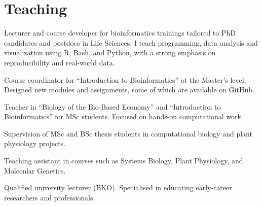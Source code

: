 \documentclass[a4paper,10pt]{article}
\begin{document}
\section*{Teaching}
\begin{description}
\raggedright
\item[\normalfont \textcolor{ColorOne}{2022 -- now.}] Lecturer and course developer for bioinformatics trainings tailored to PhD candidates and postdocs in Life Sciences. I teach programming, data analysis and visualization using R, Bash, and Python, with a strong emphasis on reproducibility and real-world data.
\item[\normalfont \textcolor{ColorOne}{2020 -- 2021.}] Course coordinator for “Introduction to Bioinformatics” at the Master's level. Designed new modules and assignments, some of which are available on GitHub.
\item[\normalfont \textcolor{ColorOne}{2018 -- 2021.}] Teacher in “Biology of the Bio-Based Economy” and “Introduction to Bioinformatics” for MSc students. Focused on hands-on computational work.
\item[\normalfont \textcolor{ColorOne}{2017 -- 2022.}] Supervision of MSc and BSc thesis students in computational biology and plant physiology projects.
\item[\normalfont \textcolor{ColorOne}{2017 -- 2020.}] Teaching assistant in courses such as Systems Biology, Plant Physiology, and Molecular Genetics.
\item Qualified university lecturer (BKO). Specialised in educating early-career researchers and professionals.
\end{description}

\end{document}

